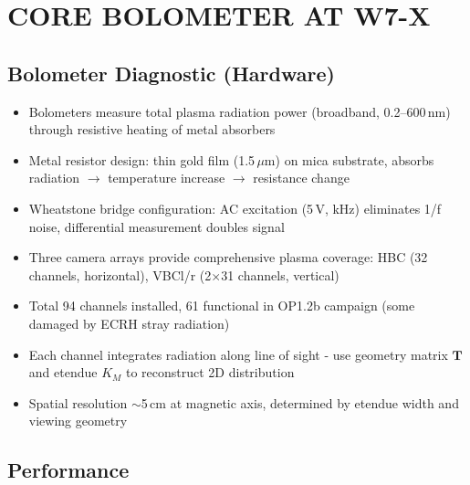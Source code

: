 \documentclass[11pt,a4paper]{article}
\begin{document}
\section{CORE BOLOMETER AT W7-X}

\subsection{Bolometer Diagnostic (Hardware)}

\begin{itemize}
\item Bolometers measure total plasma radiation power (broadband, 0.2--600\,nm) through resistive heating of metal absorbers
\item Metal resistor design: thin gold film (1.5\,$\mu$m) on mica substrate, absorbs radiation $\rightarrow$ temperature increase $\rightarrow$ resistance change
\item Wheatstone bridge configuration: AC excitation (5\,V, kHz) eliminates 1/f noise, differential measurement doubles signal
\item Three camera arrays provide comprehensive plasma coverage: HBC (32 channels, horizontal), VBCl/r (2$\times$31 channels, vertical)
\item Total 94 channels installed, 61 functional in OP1.2b campaign (some damaged by ECRH stray radiation)
\item Each channel integrates radiation along line of sight - use geometry matrix $\mathbf{T}$ and etendue $K_M$ to reconstruct 2D distribution
\item Spatial resolution $\sim$5\,cm at magnetic axis, determined by etendue width and viewing geometry
\end{itemize}

\subsection{Performance}
\end{document}
